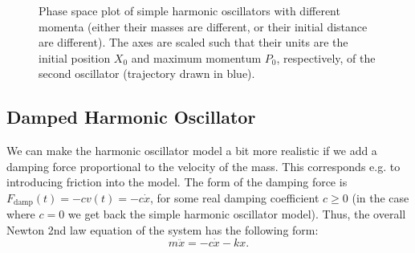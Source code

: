 \begin{figure}
  \centering
  \caption{Phase space plot of simple harmonic oscillators with different momenta (either their masses are different, or their initial distance are different). The axes are scaled such that their units are the initial position $X_{0}$ and maximum momentum $P_{0}$, respectively, of the second oscillator (trajectory drawn in blue).}
  \label{fig:harmonic_oscillator_phase_space}
\end{figure}

\subsection{Damped Harmonic Oscillator}
We can make the harmonic oscillator model a bit more realistic if we add a damping force proportional to the velocity of the mass. This corresponds e.g. to introducing friction into the model. The form of the damping force is $F_{\text{damp}}(t)=-cv(t)=-c\dot{x}$, for some real damping coefficient $c\geq0$ (in the case where $c=0$ we get back the simple harmonic oscillator model). Thus, the overall Newton 2nd law equation of the system has the following form:
\begin{equation}
  m\ddot{x} = -c\dot{x}-kx.
  \label{eq:damped_harmonic_oscillator}
\end{equation}

